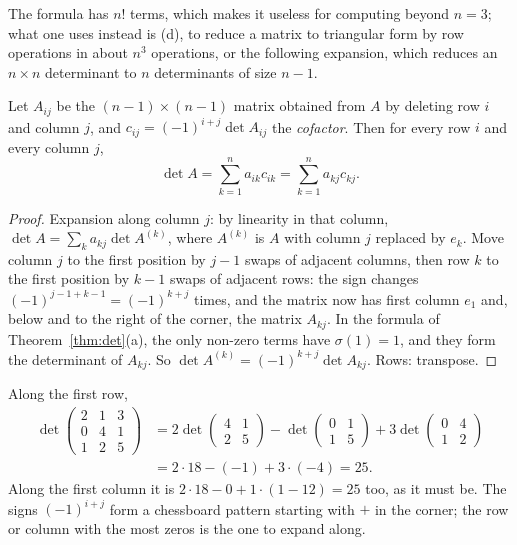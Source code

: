 The formula has $n!$ terms, which makes it useless for computing beyond $n=3$; what one uses instead is (d), to reduce a matrix to triangular form by
row operations in about $n^3$ operations, or the following expansion, which reduces an $n\times n$ determinant to $n$ determinants of size $n-1$.

\begin{propositionx}
Let $A_{ij}$ be the $(n-1)\times(n-1)$ matrix obtained from $A$ by deleting row $i$ and column $j$, and $c_{ij}=(-1)^{i+j}\det A_{ij}$ the \emph{cofactor}. Then for every row $i$ and every column $j$,
\[
\det A=\sum_{k=1}^na_{ik}c_{ik}=\sum_{k=1}^na_{kj}c_{kj}.
\]
\end{propositionx}
\begin{proof}
Expansion along column $j$: by linearity in that column, $\det A=\sum_ka_{kj}\det A^{(k)}$, where $A^{(k)}$ is $A$ with column $j$ replaced by $e_k$. Move column $j$ to the first position by $j-1$ swaps of adjacent columns, then row $k$ to the first position by $k-1$ swaps of adjacent rows: the sign changes $(-1)^{j-1+k-1}=(-1)^{k+j}$ times, and the matrix now has first column $e_1$ and, below and to the right of the corner, the matrix $A_{kj}$. In the formula of Theorem~\ref{thm:det}(a), the only non-zero terms have $\sigma(1)=1$, and they form the determinant of $A_{kj}$. So $\det A^{(k)}=(-1)^{k+j}\det A_{kj}$. Rows: transpose.
\end{proof}

\begin{examplex}
Along the first row,
\[
\begin{aligned}
\det\begin{pmatrix}2&1&3\\0&4&1\\1&2&5\end{pmatrix}
&=2\det\begin{pmatrix}4&1\\2&5\end{pmatrix}-\det\begin{pmatrix}0&1\\1&5\end{pmatrix}
+3\det\begin{pmatrix}0&4\\1&2\end{pmatrix}\\
&=2\cdot18-(-1)+3\cdot(-4)=25.
\end{aligned}
\]
Along the first column it is $2\cdot18-0+1\cdot(1-12)=25$ too, as it must be. The signs $(-1)^{i+j}$ form a chessboard pattern starting with $+$ in the corner; the row or column with the most zeros is the one to expand along.
\end{examplex}

